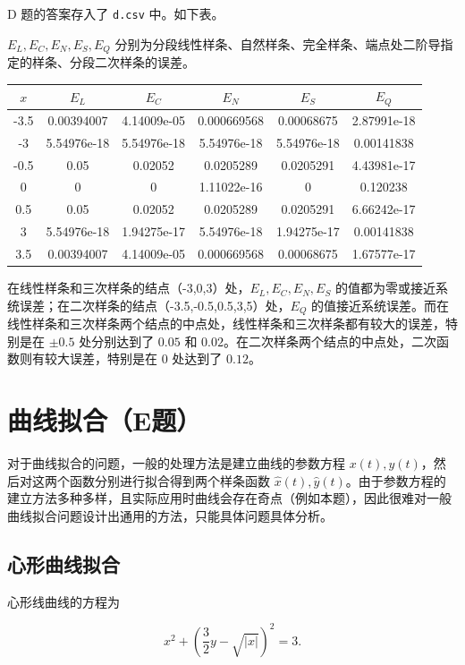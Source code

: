 \documentclass{ctexart}
\begin{document}
D 题的答案存入了 \verb|d.csv| 中。如下表。

$E_L,E_C,E_N,E_S,E_Q$ 分别为分段线性样条、自然样条、完全样条、端点处二阶导指定的样条、分段二次样条的误差。

\begin{tabular}{|c|c|c|c|c|c|} \hline
$x$ & $E_L$ & $E_C$ & $E_N$ & $E_S$ & $E_Q$  \\ \hline
-3.5 & 0.00394007 & 4.14009e-05 & 0.000669568 & 0.00068675 & 2.87991e-18 \\ \hline
-3 & 5.54976e-18 & 5.54976e-18 & 5.54976e-18 & 5.54976e-18 & 0.00141838 \\ \hline
-0.5 & 0.05 & 0.02052 & 0.0205289 & 0.0205291 & 4.43981e-17 \\ \hline
0 & 0 & 0 & 1.11022e-16 & 0 & 0.120238 \\ \hline
0.5 & 0.05 & 0.02052 & 0.0205289 & 0.0205291 & 6.66242e-17 \\ \hline
3 & 5.54976e-18 & 1.94275e-17 & 5.54976e-18 & 1.94275e-17 & 0.00141838 \\ \hline
3.5 & 0.00394007 & 4.14009e-05 & 0.000669568 & 0.00068675 & 1.67577e-17 \\ \hline
\end{tabular}

在线性样条和三次样条的结点（-3,0,3）处，$E_L,E_C,E_N,E_S$ 的值都为零或接近系统误差；在二次样条的结点（-3.5,-0.5,0.5,3,5）处，$E_Q$ 的值接近系统误差。而在线性样条和三次样条两个结点的中点处，线性样条和三次样条都有较大的误差，特别是在 $\pm 0.5$ 处分别达到了 $0.05$ 和 $0.02$。在二次样条两个结点的中点处，二次函数则有较大误差，特别是在 $0$ 处达到了 $0.12$。

\section{曲线拟合（E题）}

对于曲线拟合的问题，一般的处理方法是建立曲线的参数方程 $x(t),y(t)$，然后对这两个函数分别进行拟合得到两个样条函数 $\hat{x}(t),\hat{y}(t)$。由于参数方程的建立方法多种多样，且实际应用时曲线会存在奇点（例如本题），因此很难对一般曲线拟合问题设计出通用的方法，只能具体问题具体分析。

\subsection{心形曲线拟合}

心形线曲线的方程为

\begin{equation}
    x^2+(\dfrac 32y-\sqrt{|x|})^2=3.
\end{equation}
\end{document}
